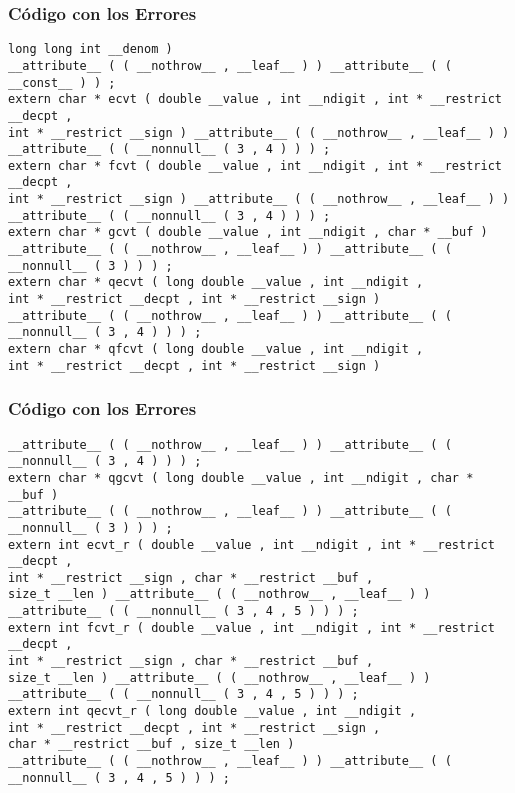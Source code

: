 \documentclass{beamer}
\begin{document}
\begin{frame}[fragile]
\frametitle{C\'odigo con los Errores}
\begin{lstlisting}[style=CStyle]
long long int __denom ) 
__attribute__ ( ( __nothrow__ , __leaf__ ) ) __attribute__ ( ( __const__ ) ) ; 
extern char * ecvt ( double __value , int __ndigit , int * __restrict __decpt , 
int * __restrict __sign ) __attribute__ ( ( __nothrow__ , __leaf__ ) ) __attribute__ ( ( __nonnull__ ( 3 , 4 ) ) ) ; 
extern char * fcvt ( double __value , int __ndigit , int * __restrict __decpt , 
int * __restrict __sign ) __attribute__ ( ( __nothrow__ , __leaf__ ) ) __attribute__ ( ( __nonnull__ ( 3 , 4 ) ) ) ; 
extern char * gcvt ( double __value , int __ndigit , char * __buf ) 
__attribute__ ( ( __nothrow__ , __leaf__ ) ) __attribute__ ( ( __nonnull__ ( 3 ) ) ) ; 
extern char * qecvt ( long double __value , int __ndigit , 
int * __restrict __decpt , int * __restrict __sign ) 
__attribute__ ( ( __nothrow__ , __leaf__ ) ) __attribute__ ( ( __nonnull__ ( 3 , 4 ) ) ) ; 
extern char * qfcvt ( long double __value , int __ndigit , 
int * __restrict __decpt , int * __restrict __sign ) 
\end{lstlisting}
\end{frame}
\begin{frame}[fragile]
\frametitle{C\'odigo con los Errores}
\begin{lstlisting}[style=CStyle]
__attribute__ ( ( __nothrow__ , __leaf__ ) ) __attribute__ ( ( __nonnull__ ( 3 , 4 ) ) ) ; 
extern char * qgcvt ( long double __value , int __ndigit , char * __buf ) 
__attribute__ ( ( __nothrow__ , __leaf__ ) ) __attribute__ ( ( __nonnull__ ( 3 ) ) ) ; 
extern int ecvt_r ( double __value , int __ndigit , int * __restrict __decpt , 
int * __restrict __sign , char * __restrict __buf , 
size_t __len ) __attribute__ ( ( __nothrow__ , __leaf__ ) ) __attribute__ ( ( __nonnull__ ( 3 , 4 , 5 ) ) ) ; 
extern int fcvt_r ( double __value , int __ndigit , int * __restrict __decpt , 
int * __restrict __sign , char * __restrict __buf , 
size_t __len ) __attribute__ ( ( __nothrow__ , __leaf__ ) ) __attribute__ ( ( __nonnull__ ( 3 , 4 , 5 ) ) ) ; 
extern int qecvt_r ( long double __value , int __ndigit , 
int * __restrict __decpt , int * __restrict __sign , 
char * __restrict __buf , size_t __len ) 
__attribute__ ( ( __nothrow__ , __leaf__ ) ) __attribute__ ( ( __nonnull__ ( 3 , 4 , 5 ) ) ) ; 
\end{lstlisting}
\end{frame}
\end{document}
